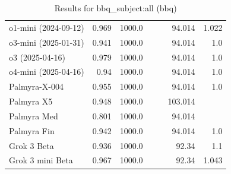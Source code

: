 \begin{table}[htp]
{\begin{tabular}{lrrrrrr}
o1-mini (2024-09-12) & 0.969 & 1000.0 &  &  & 94.014 & 1.022 \\
o3-mini (2025-01-31) & 0.941 & 1000.0 &  &  & 94.014 & 1.0 \\
o3 (2025-04-16) & 0.979 & 1000.0 &  &  & 94.014 & 1.0 \\
o4-mini (2025-04-16) & 0.94 & 1000.0 &  &  & 94.014 & 1.0 \\
Palmyra-X-004 & 0.955 & 1000.0 &  &  & 94.014 & 1.0 \\
Palmyra X5 & 0.948 & 1000.0 &  &  & 103.014 &  \\
Palmyra Med & 0.801 & 1000.0 &  &  & 94.014 &  \\
Palmyra Fin & 0.942 & 1000.0 &  &  & 94.014 & 1.0 \\
Grok 3 Beta & 0.936 & 1000.0 &  &  & 92.34 & 1.1 \\
Grok 3 mini Beta & 0.967 & 1000.0 &  &  & 92.34 & 1.043 \\
\bottomrule
\end{tabular}}
\caption{Results for bbq_subject:all (bbq)}
\label{fig:bbq_subject:all (bbq)}
\end{table}